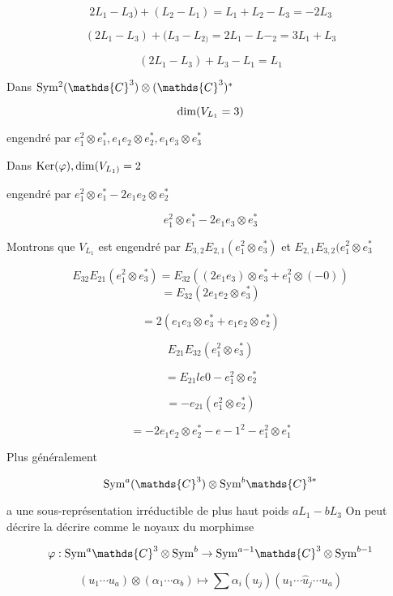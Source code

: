 \[ 2L_1 - L_3) + \left( L_2 - L_1 \right) = L_1 + L_2 - L_3 = -2 L_3  \]

\[ (2L_1 -L_3 ) + (L_3 - L_{2)} = 2 L_1 - L-_2 = 3 L_1 + L_3  \]

\[ (2L_1 - L_3) + L_3 - L_1 = L_1 \]

Dans \( {\rm{}Sym^{2}}(\mathds{C}^{3}) \otimes (\mathds{C}^{3}) ^{*} \) 

\[ {\rm{}dim}(V_{L_1} = 3) \]

engendré par \(e_1^{2} \otimes e_1 ^{*}, e_1 e_2 \otimes e_2 ^{*}, e_1 e_3 \otimes e_3 ^{*} \)

Dans \({\rm{}Ker}(\varphi), {\rm{}dim}(V_{L_{1})} = 2 \)

engendré par \(e_1 ^2 \otimes e_1 ^{*} - 2 e_1 e_2 \otimes e_2 ^{*} \)

\[ e_1 ^2 \otimes e_1 ^{*} - 2 e_1 e_3 \otimes e_3 ^{*} \]

Montrons que \(V_{L_1} \) est engendré par \(E_{3,2} E_{2,1} (e_1^{2} \otimes e_3 ^{*}) \) et \(E_{2,1} E_{3,2} (e_1^{2} \otimes e_3 ^{*}\)

\[ E_{32} E_{21} \left( e_1 ^2 \otimes e_3 ^{*}  \right) =E_{32} \left( (2e_1 e_3 ) \otimes e_3 ^{*} + e_1^{2} \otimes (-0) \right)  \]
\[ = E_{32} \left( 2 e_1 e_2 \otimes e_3 ^{*} \right)  \]

\[ = 2 (e_1 e_3 \otimes e_3 ^{*} + e_1 e_2 \otimes e_2 ^{*}) \]

\[ E_{21} E_{32} \left( e_1^{2} \otimes e_3 ^{*}  \right)  \]

\[ = E_{21} le	0 - e_1 ^2 \otimes e_2 ^{*} \]

\[  = - e_{21} \left( e_1 ^ 2 \otimes e_2 ^{*} \right)  \]

\[ = - 2 e_1 e_2 \otimes e_2 ^{*} - e-1 ^2 - e_1 ^2 \otimes e_1 ^{*} \]


Plus généralement

\[ {\rm{}Sym}^a (\mathds{C}^{3}) \otimes {\rm{}Sym}^b \mathds{C}^{3*} \]

a une sous-représentation irréductible de plus haut poids \(a L_1 - b L_3\)
On peut décrire la décrire comme le noyaux du morphimse

\[ \varphi: {\rm{}Sym}^a \mathds{C}^{3} \otimes {\rm{}Sym}^b \to {\rm{}Sym}^{a-1} \mathds{C}^{3} \otimes {\rm{}Sym}^{b-1}\]


\[ \left( u_1 \dotsb u_a  \right)  \otimes (\alpha_1 \dotsb \alpha_b) \mapsto \sum \alpha_i (u_j ) \left( u_1 \dotsb \hat u_j \dotsb u_a  \right)  \]



